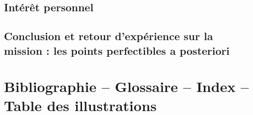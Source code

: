 \documentclass[a4paper, 12pt]{article}
\begin{document}

    
    \newpage{}
    
\subsection{Intérêt personnel}


    
    \newpage{}
    
\subsection{Conclusion et retour d'expérience sur la mission : les points perfectibles a posteriori}


    
    \newpage{}
    
\newpage{}
\section{Bibliographie – Glossaire – Index – Table des illustrations}

\end{document}
